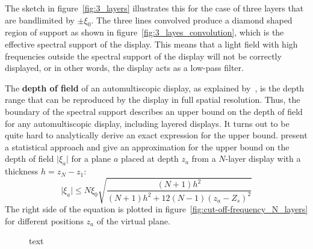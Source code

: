 The sketch in figure~\ref{fig:3_layers} illustrates this for the case of three layers that are bandlimited by $\pm \xi_0$.
The three lines convolved produce a diamond shaped region of support as shown in figure~\ref{fig:3_layes_convolution}, which is the effective spectral support of the display.
This means that a light field with high frequencies outside the spectral support of the display will not be correctly displayed, or in other words, the display acts as a low-pass filter.

The \textbf{depth of field} of an automultiscopic display, as explained by~\cite{Antialiasingfor3DDisplays}, is the depth range that can be reproduced by the display in full spatial resolution.
Thus, the boundary of the spectral support describes an upper bound on the depth of field for any automultiscopic display, including layered displays.
It turns out to be quite hard to analytically derive an exact expression for the upper bound.
\cite{WetzsteinTomo} present a statistical approach and give an approximation for the upper bound on the depth of field $\lvert \xi_a \rvert$ for a plane $a$ placed at depth $z_a$ from a \mbox{$N$-layer} display with a thickness $h = z_N - z_1$:
\begin{equation}\label{eq:approx_upper_bound_spatial_cut_off}
	\lvert \xi_a \rvert \leq N \xi_0 \sqrt{ \frac{(N + 1) h^2}{(N + 1) h^2 + 12(N - 1)(z_a - Z_s)^2} }
\end{equation}
The right side of the equation is plotted in figure~\ref{fig:cut-off-frequency_N_layers} for different positions $z_a$ of the virtual plane.
\begin{figure}[tb]
	\hfill%
	\hfill%
	\hfill%
	\caption{text}
\end{figure}
